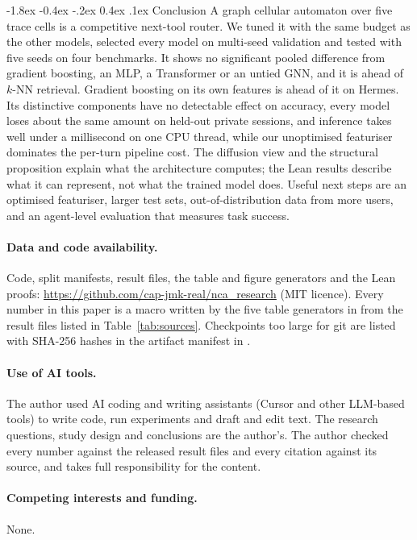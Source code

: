 \documentclass[10pt,twocolumn,letterpaper]{article}
\makeatletter
\renewcommand\section{\@startsection {section}{1}{\z@}%
  {-1.8ex \@plus -0.4ex \@minus -.2ex}%
  {0.4ex \@plus.1ex}%
  {\normalfont\normalsize\bfseries}}
\makeatother
\begin{document}
\section{Conclusion}\label{sec:conclusion}
A graph cellular automaton over five trace cells is a competitive next-tool router. We tuned it with the same budget as the other models, selected every model on multi-seed validation and tested with five seeds on four benchmarks. It shows no significant pooled difference from gradient boosting, an MLP, a Transformer or an untied GNN, and it is ahead of $k$-NN retrieval. Gradient boosting on its own features is ahead of it on Hermes. Its distinctive components have no detectable effect on accuracy, every model loses about the same amount on held-out private sessions, and inference takes well under a millisecond on one CPU thread, while our unoptimised featuriser dominates the per-turn pipeline cost. The diffusion view and the structural proposition explain what the architecture computes; the Lean results describe what it can represent, not what the trained model does. Useful next steps are an optimised featuriser, larger test sets, out-of-distribution data from more users, and an agent-level evaluation that measures task success.

\paragraph{Data and code availability.}\sloppy Code, split manifests, result files, the table and figure generators and the Lean proofs: \url{https://github.com/cap-jmk-real/nca_research} (MIT licence). Every number in this paper is a macro written by the five table generators in  from the result files listed in Table~\ref{tab:sources}. Checkpoints too large for git are listed with SHA-256 hashes in the artifact manifest in .
\paragraph{Use of AI tools.} The author used AI coding and writing assistants (Cursor and other LLM-based tools) to write code, run experiments and draft and edit text. The research questions, study design and conclusions are the author's. The author checked every number against the released result files and every citation against its source, and takes full responsibility for the content.
\paragraph{Competing interests and funding.} None.
\end{document}
